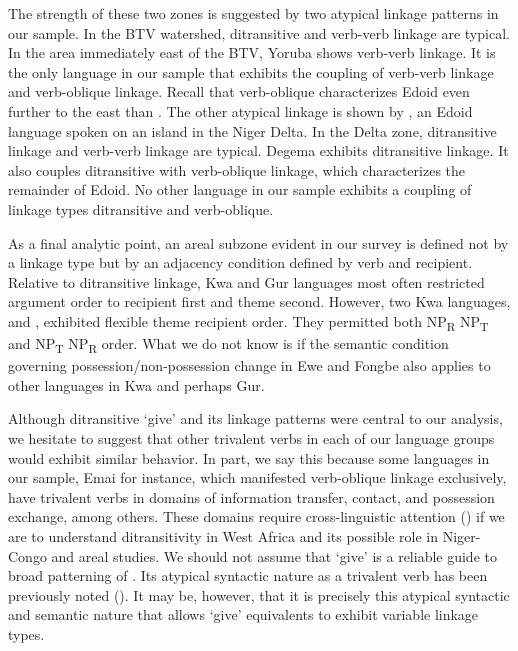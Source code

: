 \documentclass[output=paper,colorlinks,citecolor=brown]{langscibook}
\begin{document}
The strength of these two zones is suggested by two atypical linkage patterns in our sample. In the BTV watershed, ditransitive and verb-verb linkage are typical. In the area immediately east of the BTV, Yoruba shows verb-verb linkage. It is the only language in our sample that exhibits the coupling of verb-verb linkage and verb-oblique linkage. Recall that verb-oblique characterizes Edoid even further to the east than . The other atypical linkage is shown by , an Edoid language spoken on an island in the Niger Delta. In the Delta zone, ditransitive linkage and verb-verb linkage are typical. Degema exhibits ditransitive linkage. It also couples ditransitive with verb-oblique linkage, which characterizes the remainder of Edoid. No other language in our sample exhibits a coupling of linkage types ditransitive and verb-oblique.

As a final analytic point, an areal  subzone evident in our survey is defined not by a linkage type but by an adjacency condition defined by verb and recipient. Relative to ditransitive linkage, Kwa and Gur languages most often restricted argument order to recipient first and theme second. However, two Kwa languages,  and , exhibited flexible theme recipient order. They permitted both NP\textsubscript{R} NP\textsubscript{T} and NP\textsubscript{T} NP\textsubscript{R} order. What we do not know is if the semantic condition governing possession/non-possession change in Ewe and Fongbe also applies to other languages in Kwa and perhaps Gur.

Although ditransitive ‘give’ and its linkage patterns were central to our analysis, we hesitate to suggest that other trivalent verbs in each of our language groups would exhibit similar behavior. In part, we say this because some languages in our sample, Emai for instance, which manifested verb-oblique linkage exclusively, have trivalent verbs in domains of information transfer, contact, and possession exchange, among others. These domains require cross-linguistic attention (\cite{Gruber1992}) if we are to understand ditransitivity in West Africa and its possible role in Niger-Congo and areal studies. We should not assume that ‘give’ is a reliable guide to broad patterning of . Its atypical syntactic nature as a trivalent verb has been previously noted (\citealt{BorgComrie1984, Kittilä2006}). It may be, however, that it is precisely this atypical syntactic and semantic nature that allows ‘give’ equivalents to exhibit variable linkage types.
\end{document}
